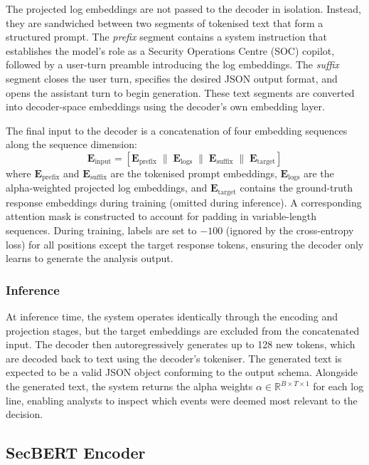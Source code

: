 The projected log embeddings are not passed to the decoder in isolation. Instead, they are sandwiched between two segments of tokenised text that form a structured prompt. The \textit{prefix} segment contains a system instruction that establishes the model's role as a Security Operations Centre (SOC) copilot, followed by a user-turn preamble introducing the log embeddings. The \textit{suffix} segment closes the user turn, specifies the desired JSON output format, and opens the assistant turn to begin generation. These text segments are converted into decoder-space embeddings using the decoder's own embedding layer.

The final input to the decoder is a concatenation of four embedding sequences along the sequence dimension:
\begin{equation}\label{eq:forward-concat}
    \mathbf{E}_{\text{input}} = [\mathbf{E}_{\text{prefix}} \; \| \; \mathbf{E}_{\text{logs}} \; \| \; \mathbf{E}_{\text{suffix}} \; \| \; \mathbf{E}_{\text{target}}]
\end{equation}
where $\mathbf{E}_{\text{prefix}}$ and $\mathbf{E}_{\text{suffix}}$ are the tokenised prompt embeddings, $\mathbf{E}_{\text{logs}}$ are the alpha-weighted projected log embeddings, and $\mathbf{E}_{\text{target}}$ contains the ground-truth response embeddings during training (omitted during inference). A corresponding attention mask is constructed to account for padding in variable-length sequences. During training, labels are set to $-100$ (ignored by the cross-entropy loss) for all positions except the target response tokens, ensuring the decoder only learns to generate the analysis output.

\subsubsection{Inference}

At inference time, the system operates identically through the encoding and projection stages, but the target embeddings are excluded from the concatenated input. The decoder then autoregressively generates up to 128 new tokens, which are decoded back to text using the decoder's tokeniser. The generated text is expected to be a valid JSON object conforming to the output schema. Alongside the generated text, the system returns the alpha weights $\alpha \in \mathbb{R}^{B \times T \times 1}$ for each log line, enabling analysts to inspect which events were deemed most relevant to the decision.

\subsection{SecBERT Encoder}\label{sec:encoder}

